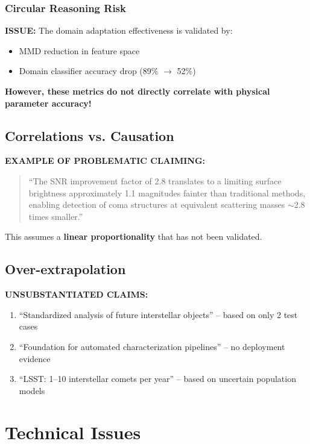 \documentclass[12pt,a4paper]{article}
\newcommand{\critical}[1]{\textcolor{CriticalRed}{\textbf{#1}}}
\newcommand{\warning}[1]{\textcolor{WarningOrange}{\textbf{#1}}}
\begin{document}
\subsubsection{Circular Reasoning Risk}

\warning{ISSUE:} The domain adaptation effectiveness is validated by:
\begin{itemize}
    \item MMD reduction in feature space
    \item Domain classifier accuracy drop (89\% $\rightarrow$ 52\%)
\end{itemize}

\critical{However, these metrics do not directly correlate with physical parameter accuracy!}

\subsection{Correlations vs. Causation}

\warning{EXAMPLE OF PROBLEMATIC CLAIMING:}

\begin{quote}
``The SNR improvement factor of 2.8 translates to a limiting surface brightness approximately 1.1 magnitudes fainter than traditional methods, enabling detection of coma structures at equivalent scattering masses $\sim$2.8 times smaller.''
\end{quote}

This assumes a \textbf{linear proportionality} that has not been validated.

\subsection{Over-extrapolation}

\critical{UNSUBSTANTIATED CLAIMS:}

\begin{enumerate}
    \item ``Standardized analysis of future interstellar objects'' -- based on only 2 test cases
    \item ``Foundation for automated characterization pipelines'' -- no deployment evidence
    \item ``LSST: 1--10 interstellar comets per year'' -- based on uncertain population models
\end{enumerate}

\section{Technical Issues}
\end{document}
